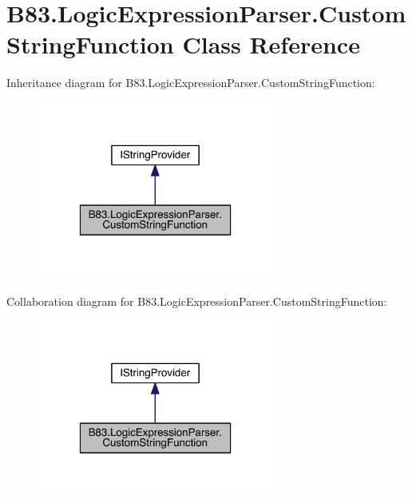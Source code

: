 \hypertarget{class_b83_1_1_logic_expression_parser_1_1_custom_string_function}{}\section{B83.\+Logic\+Expression\+Parser.\+Custom\+String\+Function Class Reference}
\label{class_b83_1_1_logic_expression_parser_1_1_custom_string_function}


Inheritance diagram for B83.\+Logic\+Expression\+Parser.\+Custom\+String\+Function\+:\nopagebreak
\begin{figure}[H]
\begin{center}
\leavevmode
\includegraphics[width=220pt]{class_b83_1_1_logic_expression_parser_1_1_custom_string_function__inherit__graph}
\end{center}
\end{figure}


Collaboration diagram for B83.\+Logic\+Expression\+Parser.\+Custom\+String\+Function\+:\nopagebreak
\begin{figure}[H]
\begin{center}
\leavevmode
\includegraphics[width=220pt]{class_b83_1_1_logic_expression_parser_1_1_custom_string_function__coll__graph}
\end{center}
\end{figure}
